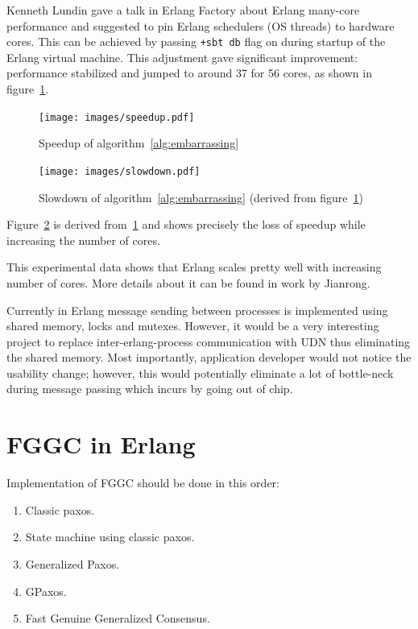 \documentclass[english,11pt]{l4proj}
\newcommand{\fggc}{Fast Genuine Generalized Consensus}
\begin{document}
Kenneth Lundin gave a talk in Erlang Factory\cite{lundin-smp} about Erlang
many-core performance and suggested to pin Erlang schedulers (OS threads) to
hardware cores. This can be achieved by passing {\tt +sbt db} flag on during
startup of the Erlang virtual machine. This adjustment gave significant
improvement: performance stabilized and jumped to around 37 for 56 cores, as
shown in figure~\ref{fig:parallel_speedup}.

\begin{figure}
    \centering
    \texttt{[image: images/speedup.pdf]}
    \caption{Speedup of algorithm~\ref{alg:embarrassing}}
    \label{fig:parallel_speedup}
\end{figure}

\begin{figure}
    \centering
    \texttt{[image: images/slowdown.pdf]}
    \caption{Slowdown of algorithm~\ref{alg:embarrassing} (derived
    from figure~\ref{fig:parallel_speedup})}
    \label{fig:parallel_slowdown}
\end{figure}

Figure~\ref{fig:parallel_slowdown} is derived from~\ref{fig:parallel_speedup}
and shows precisely the loss of speedup while increasing the number of cores.

This experimental data shows that Erlang scales pretty well with increasing
number of cores. More details about it can be found in work by
Jianrong\cite{erlang-manycore-scalability}.

Currently in Erlang message sending between processes is implemented using
shared memory, locks and mutexes. However, it would be a very interesting
project to replace inter-erlang-process communication with UDN thus eliminating
the shared memory. Most importantly, application developer would not notice the
usability change; however, this would potentially eliminate a lot of bottle-neck
during message passing which incurs by going out of chip.

\section{FGGC in Erlang}
\label{sec:paxos-api}

Implementation of FGGC should be done in this order:

\begin{enumerate}
    \item Classic paxos.
    \item State machine using classic paxos.
    \item Generalized Paxos.
    \item GPaxos.
    \item \fggc.
\end{enumerate}
\end{document}
